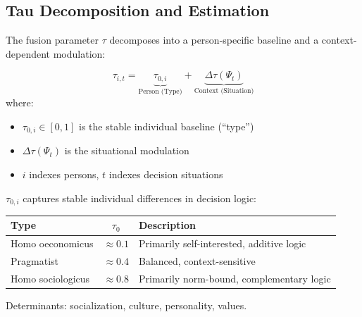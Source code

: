 \subsection{Tau Decomposition and Estimation}
\label{sec:tau-estimation}

The fusion parameter $\tau$ decomposes into a person-specific baseline and a context-dependent modulation:

\begin{definition}
\label{def:tau-decomposition}
\begin{equation}
\tau_{i,t} = \underbrace{\tau_{0,i}}_{\text{Person (Type)}} + \underbrace{\Delta\tau(\Psi_t)}_{\text{Context (Situation)}}
\end{equation}
where:
\begin{itemize}
\item $\tau_{0,i} \in [0,1]$ is the stable individual baseline (``type'')
\item $\Delta\tau(\Psi_t)$ is the situational modulation
\item $i$ indexes persons, $t$ indexes decision situations
\end{itemize}
\end{definition}

\begin{definition}
\label{def:tau-baseline}
$\tau_{0,i}$ captures stable individual differences in decision logic:
\begin{table}[htbp]
\centering
\begin{tabular}{@{}lcp{6cm}@{}}
\toprule
\textbf{Type} & $\tau_0$ & \textbf{Description} \\
\midrule
Homo oeconomicus & $\approx 0.1$ & Primarily self-interested, additive logic \\
Pragmatist & $\approx 0.4$ & Balanced, context-sensitive \\
Homo sociologicus & $\approx 0.8$ & Primarily norm-bound, complementary logic \\
\bottomrule
\end{tabular}
\end{table}

Determinants: socialization, culture, personality, values.
\end{definition}

